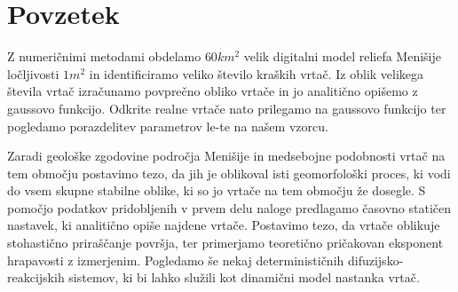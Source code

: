 \documentclass[a4paper, oneside, 12pt]{book}
\newcommand{\clearemptydoublepage}{\newpage{\pagestyle{empty}\cleardoublepage}}
\begin{document}
      \clearemptydoublepage

        \def\thepage{}%
        \tableofcontents{}

        \clearemptydoublepage

        \chapter*{Povzetek}

        Z numeričnimi metodami obdelamo $60 km^2$ velik digitalni model reliefa Menišije ločljivosti $1m^2$ in identificiramo veliko število kraških vrtač. Iz oblik velikega števila vrtač izračunamo povprečno obliko vrtače in jo analitično opišemo z gaussovo funkcijo. Odkrite realne vrtače nato prilegamo na gaussovo funkcijo ter pogledamo porazdelitev parametrov le-te na našem vzorcu.

        Zaradi geološke zgodovine področja Menišije in medsebojne podobnosti vrtač na tem območju postavimo tezo, da jih je oblikoval isti geomorfološki proces, ki vodi do vsem skupne stabilne oblike, ki so jo vrtače na tem območju že dosegle.
        S pomočjo podatkov pridobljenih v prvem delu naloge predlagamo časovno statičen nastavek, ki analitično opiše najdene vrtače. Postavimo tezo, da vrtače oblikuje stohastično priraščanje površja, ter primerjamo teoretično pričakovan eksponent hrapavosti z izmerjenim. Pogledamo še nekaj determinističnih difuzijsko-reakcijskih sistemov, ki bi lahko služili kot dinamični model nastanka vrtač.
\end{document}
